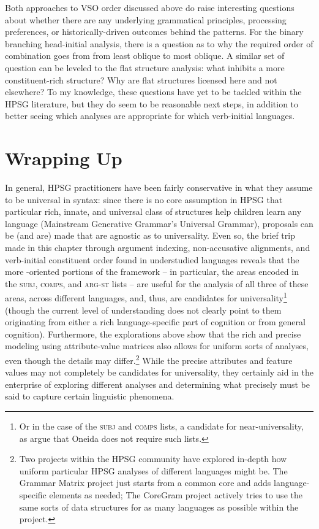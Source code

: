 \documentclass[output=paper
	        ,collection
	        ,collectionchapter
 	        ,biblatex
                ,babelshorthands
                ,newtxmath
                ,draftmode
                ,colorlinks, citecolor=brown
]{langscibook}
\begin{document}
Both approaches to VSO order discussed above do raise interesting questions about whether there are any underlying grammatical principles, processing preferences, or historically-driven outcomes behind the patterns. For the binary branching head-initial analysis, there is a question as to why the required order of combination goes from from least oblique to most oblique. A similar set of question can be leveled to the flat structure analysis: what inhibits a more constituent-rich structure? Why are flat structures licensed here and not elsewhere? To my knowledge, these questions have yet to be tackled within the HPSG literature, but they do seem to be reasonable next steps, in addition to better seeing which analyses are appropriate for which verb-initial languages. 
	
\section{Wrapping Up}

In general, HPSG practitioners have been fairly conservative in what they assume to be universal in syntax: since there is no core assumption in HPSG that particular rich, innate, and universal class of structures help children learn any language (Mainstream Generative Grammar's Universal Grammar), proposals can be (and are) made that are agnostic as to universality. Even so, the brief trip made in this chapter through argument indexing, non-accusative alignments, and verb-initial constituent order found in understudied languages reveals that the more -oriented portions of the framework -- in particular, the areas encoded in the \textsc{subj}, \textsc{comps}, and \textsc{arg-st} lists -- are useful for the analysis of all three of these areas, across different languages, and, thus, are candidates for universality\footnote{Or in the case of the \textsc{subj} and \textsc{comps} lists, a candidate for near-universality, as \cite{KM15} argue that Oneida does not require such lists.} (though the current level of understanding does not clearly point to them originating from either a rich language-specific part of cognition or from general cognition). Furthermore, the explorations above show that the rich and precise modeling using attribute-value matrices also allows for uniform sorts of analyses, even though the details may differ.\footnote{Two projects within the HPSG community have explored in-depth how uniform particular HPSG analyses of different languages might be. The Grammar Matrix project \citep{BDFPS2010a-u} just starts from a common core and adds language-specific elements as needed; The CoreGram project \citep{MuellerCoreGram} actively tries to use the same sorts of data structures for as many languages as possible within the project.} While the precise attributes and feature values may not completely be candidates for universality, they certainly aid in the enterprise of exploring different analyses and determining what precisely must be said to capture certain linguistic phenomena. 
\end{document}
